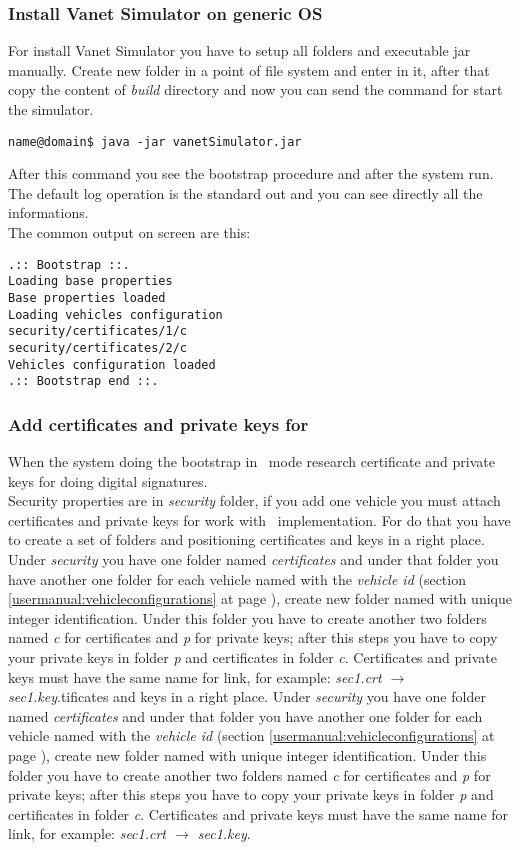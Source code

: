 \subsubsection{Install Vanet Simulator on generic OS}
For install Vanet Simulator you have to setup all folders and executable jar manually. Create new folder in a point of file system and enter in it, after that copy the content of \textit{build} directory and now you can send the command for start the simulator.
\begin{verbatim}
name@domain$ java -jar vanetSimulator.jar
\end{verbatim}
After this command you see the bootstrap procedure and after the system run. The default log operation is the standard out and you can see directly all the informations.\\
The common output on screen are this:
\begin{verbatim}
.:: Bootstrap ::.
Loading base properties
Base properties loaded
Loading vehicles configuration
security/certificates/1/c
security/certificates/2/c
Vehicles configuration loaded
.:: Bootstrap end ::.
\end{verbatim}
\subsubsection{Add certificates and private keys for \baseline}\label{usermanual:preloadkey}
When the system doing the bootstrap in \baseline~mode research certificate and private keys for doing digital signatures.\\
Security properties are in \textit{security} folder, if you add one vehicle you must attach certificates and private keys for work with \baseline~implementation. For do that you have to create a set of folders and positioning certificates and keys in a right place. Under \textit{security} you have one folder named \textit{certificates} and under that folder you have another one folder for each vehicle named with the \textit{vehicle id} (section \ref{usermanual:vehicleconfigurations} at page \pageref{usermanual:vehicleconfigurations}), create new folder named with unique integer identification. Under this folder you have to create another two folders named \textit{c} for certificates and \textit{p} for private keys; after this steps you have to copy your private keys in folder \textit{p} and certificates in folder \textit{c}. Certificates and private keys must have the same name for link, for example: \textit{sec1.crt $\rightarrow$ sec1.key}.tificates and keys in a right place. Under \textit{security} you have one folder named \textit{certificates} and under that folder you have another one folder for each vehicle named with the \textit{vehicle id} (section \ref{usermanual:vehicleconfigurations} at page \pageref{usermanual:vehicleconfigurations}), create new folder named with unique integer identification. Under this folder you have to create another two folders named \textit{c} for certificates and \textit{p} for private keys; after this steps you have to copy your private keys in folder \textit{p} and certificates in folder \textit{c}. Certificates and private keys must have the same name for link, for example: \textit{sec1.crt $\rightarrow$ sec1.key}.


